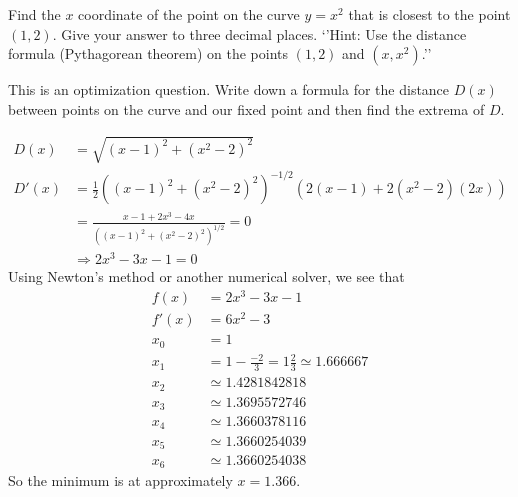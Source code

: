 \documentclass{ximera}
\author{Emma Smith Zbarsky}
\begin{document}
\begin{exercise}

Find the $x$ coordinate of the point on the curve $y=x^2$ that is
closest to the point $(1,2)$. Give your answer to three decimal places.
`'Hint: Use the distance formula (Pythagorean theorem) on the points
$(1,2)$ and $(x,x^2)$.''


\begin{hint}
This is an optimization question. Write down a formula for the distance
$D(x)$ between points on the curve and our fixed point and then find the
extrema of $D$.
\end{hint}


\begin{hint}
\begin{align*}
D(x) &= \sqrt{(x-1)^2+(x^2-2)^2} \\
D'(x) &= \frac{1}{2}\left((x-1)^2+(x^2-2)^2\right)^{-1/2}\left(2(x-1)+2(x^2-2)(2x)\right) \\
&= \frac{x-1+2x^3-4x}{\left((x-1)^2+(x^2-2)^2\right)^{1/2}} = 0 \\
&\Rightarrow 2x^3-3x-1 = 0
\end{align*} Using Newton's method or another numerical solver, we see
that \begin{align*}
f(x) &= 2x^3-3x-1 \\
f'(x) &= 6x^2-3 \\
x_0 &= 1 \\
x_1 &= 1 - \frac{-2}{3} = 1\frac{2}{3} \simeq  1.666667\\
x_2 &\simeq 1.4281842818 \\
x_3 & \simeq 1.3695572746 \\
x_4 & \simeq 1.3660378116 \\
x_5 & \simeq 1.3660254039 \\
x_6 & \simeq 1.3660254038 \end{align*} So the minimum is at
approximately $x=1.366$.
\end{hint}


\begin{multipleChoice}
\end{multipleChoice}

\end{exercise}
\end{document}
